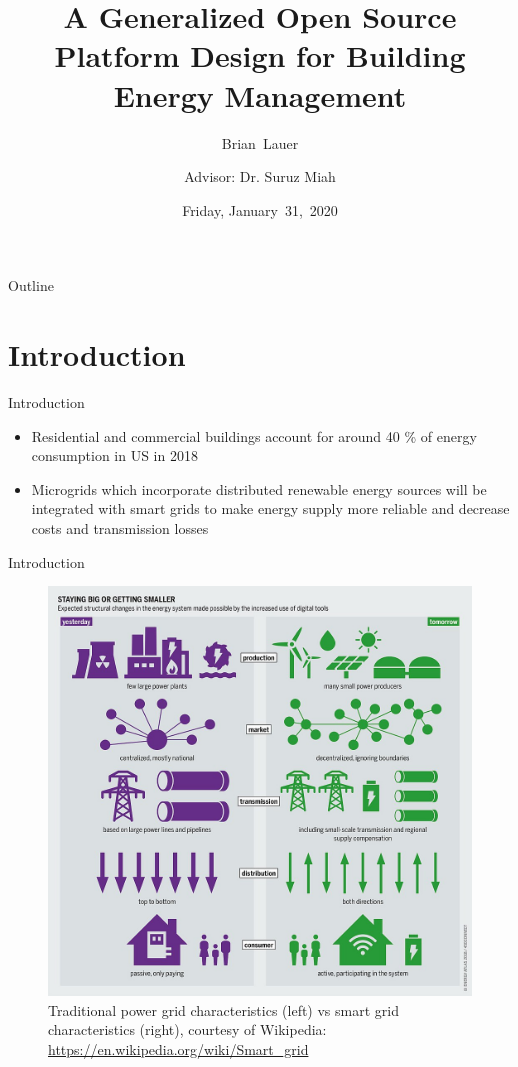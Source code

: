\documentclass{beamer}
\title[]{A Generalized Open Source Platform Design for Building Energy Management}
\author[B.~Lauer]{Brian~Lauer\\\and
Advisor: Dr. Suruz Miah}
\institute[Bradley University] %
{
  Department of Electrical and Computer Engineering\\
  Bradley University\\
  1501 W. Bradley Avenue\\
  Peoria, IL, 61625, USA
}
\date[Friday~31,~2020]{Friday, January~31,~2020}
\begin{document}
\begin{frame}
  \titlepage
\end{frame}

\begin{frame}{Outline}
  \tableofcontents
\end{frame}

\section{Introduction}

\begin{frame}{Introduction}{}
  	\begin{itemize}
  		\item Residential and commercial buildings account for around 40 \% of energy consumption in US in 2018
  		\item Microgrids which incorporate distributed renewable energy sources will be integrated with smart grids to make energy supply more reliable and decrease costs and transmission losses
  	\end{itemize}
\end{frame}

\begin{frame}{Introduction}{}
\begin{figure}
\includegraphics[scale=0.18]{../figs/img/microgridsAndSmartgrids}
\caption{Traditional power grid characteristics (left) vs smart grid characteristics (right), courtesy of Wikipedia: \url{https://en.wikipedia.org/wiki/Smart_grid}}
\end{figure}
\end{frame}
\end{document}
